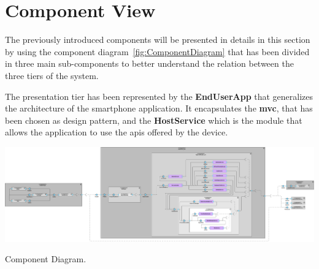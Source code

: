 \section{Component View}

The previously introduced components will be presented in details in this section by using the component diagram~\ref{fig:ComponentDiagram} that has been divided in three main sub-components to better understand the relation between the three tiers of the system.

The presentation tier has been represented by the \textbf{EndUserApp} that generalizes the architecture of the smartphone application.
It encapsulates the \textbf{\gls{mvc}}, that has been chosen as design pattern, and the \textbf{HostService} which is the module that allows the application to use the \glspl{api} offered by the device.

\begin{table} %
    \centering
    \includegraphics[width=1.0\textwidth]{images/component_diagram.pdf}
    \caption{Component Diagram.}\label{fig:ComponentDiagram}
\end{table} %

